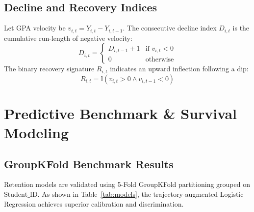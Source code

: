 \documentclass[10pt,journal,compsoc]{IEEEtran}
\begin{document}
\subsection{Decline and Recovery Indices}
Let GPA velocity be $v_{i,t} = Y_{i,t} - Y_{i,t-1}$. The consecutive decline index $D_{i,t}$ is the cumulative run-length of negative velocity:
\begin{equation}
D_{i,t} = \begin{cases} 
D_{i,t-1} + 1 & \text{if } v_{i,t} < 0 \\ 
0 & \text{otherwise} 
\end{cases}
\end{equation}
The binary recovery signature $R_{i,t}$ indicates an upward inflection following a dip:
\begin{equation}
R_{i,t} = \mathbb{I}(v_{i,t} > 0 \land v_{i,t-1} < 0)
\end{equation}

\section{Predictive Benchmark \& Survival Modeling}

\subsection{GroupKFold Benchmark Results}
Retention models are validated using 5-Fold GroupKFold partitioning grouped on $\text{Student\_ID}$. As shown in Table~\ref{tab:models}, the trajectory-augmented Logistic Regression achieves superior calibration and discrimination.

\begin{table}[htbp]
\caption{Cross-Validated Model Performance (5-Fold GroupKFold)}
\label{tab:models}
\centering
{}
\end{table}
\end{document}
